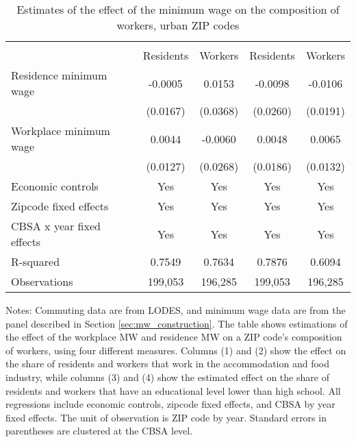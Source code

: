 \begin{table}[hbt!] \centering
    \caption{Estimates of the effect of the minimum wage on the composition of workers, urban ZIP codes}
    \label{tab:share_migration}
    \begin{tabular}{lcccc}
        \toprule 
        &  &  \\ \cmidrule(lr){2-3} \cmidrule(lr){4-5}
                    & Residents & Workers & Residents & Workers \\  \midrule
        Residence minimum wage &  -0.0005  &  0.0153  &  -0.0098  &  -0.0106  \\
                               & (0.0167) & (0.0368) & (0.0260) & (0.0191) \\
        Workplace minimum wage &  0.0044  &  -0.0060  &  0.0048  &  0.0065  \\
                               & (0.0127) & (0.0268) & (0.0186) & (0.0132) \\  \midrule
        Economic controls           &  Yes   &  Yes   &  Yes  &  Yes  \\
        Zipcode fixed effects       &  Yes   &  Yes   &  Yes  &  Yes  \\
        CBSA x year fixed effects   &  Yes   &  Yes   &  Yes  &  Yes  \\
        R-squared                   &  0.7549   &  0.7634   &  0.7876  &  0.6094  \\
        Observations                &  199,053  &  196,285  &  199,053 &  196,285  
        \\\bottomrule
    \end{tabular}
    
    \begin{minipage}{.95\textwidth} \footnotesize
        \vspace{2mm}
        Notes:
        Commuting data are from LODES, and minimum wage 
        data are from the panel described in Section \ref{sec:mw_construction}.
        The table shows estimations of the effect of the workplace MW and
        residence MW on a ZIP code's composition of workers, using four different measures. Columns (1) and (2) show the effect on the share of residents and workers that work in the accommodation and food industry, while columns (3) and (4) show the estimated effect on the share of residents and workers that have an educational level lower than high school. 
        All regressions include economic controls, zipcode fixed effects, and CBSA by year fixed effects.
        The unit of observation is ZIP code by year.
        Standard errors in parentheses are clustered at the CBSA level.
    \end{minipage}
\end{table}
